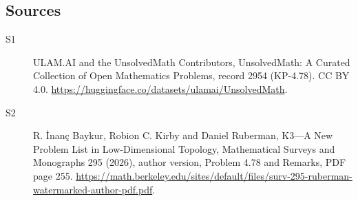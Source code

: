 \documentclass[11pt]{article}
\begin{document}
\subsection{Sources}
\begin{description}
\item[\hypertarget{source:2954:1}{S1}] ULAM.AI and the UnsolvedMath Contributors, UnsolvedMath: A Curated Collection of Open Mathematics Problems, record 2954 (KP-4.78). CC BY 4.0. \url{https://huggingface.co/datasets/ulamai/UnsolvedMath}.
\item[\hypertarget{source:2954:2}{S2}] R. İnanç Baykur, Robion C. Kirby and Daniel Ruberman, K3—A New Problem List in Low-Dimensional Topology, Mathematical Surveys and Monographs 295 (2026), author version, Problem 4.78 and Remarks, PDF page 255. \url{https://math.berkeley.edu/sites/default/files/surv-295-ruberman-watermarked-author-pdf.pdf}.
\end{description}
\label{end:2954}
\end{document}
